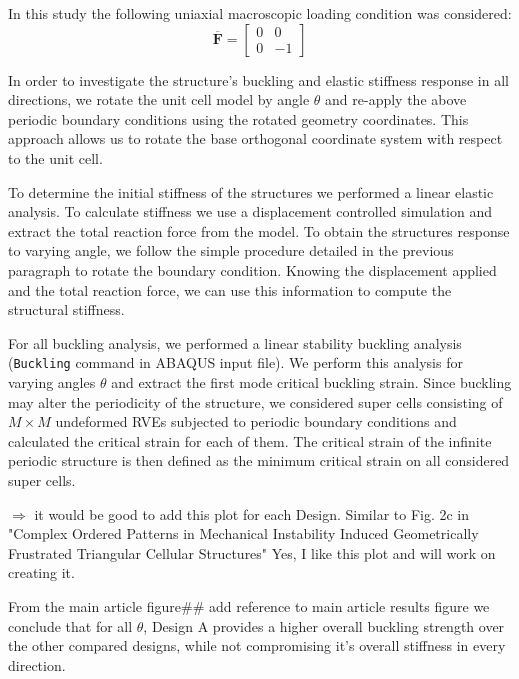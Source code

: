 \documentclass[10pt,twoside]{fernandes_supp}
\newcommand{\KB}[1]{\noindent\color{blue}$\Longrightarrow$ #1\normalcolor}
\newcommand{\mf}[1]{\colorbox{blue!10}{\color{color3}#1}}
\begin{document}
In this study the following uniaxial macroscopic loading condition was considered: \begin{equation}
\overline{\mathbf{F}} = \begin{bmatrix}
0&0\\
0&-1
\end{bmatrix} 
\end{equation}

In order to investigate the structure's buckling and elastic stiffness response in all directions, we rotate the unit cell model by angle $\theta$ and re-apply the above periodic boundary conditions using the rotated geometry coordinates. This approach allows us to rotate the base orthogonal coordinate system with respect to the unit cell. 

To determine the initial stiffness of the structures we performed a linear elastic analysis. To calculate stiffness we use a displacement controlled simulation and extract the total reaction force from the model. To obtain the structures response to varying angle, we follow the simple procedure detailed in the previous paragraph to rotate the boundary condition. Knowing the displacement applied and the total reaction force, we can use this information to compute the structural stiffness.

For all buckling analysis, we performed a linear stability buckling analysis ({\tt *Buckling} command in ABAQUS input file). We perform this analysis for varying angles $\theta$ and extract the first mode critical buckling strain. Since buckling may alter the periodicity of the
structure, we considered super cells consisting of $M \times M$
undeformed RVEs subjected to periodic boundary
conditions and calculated the critical strain for each of
them. The critical strain of the infinite periodic structure is
then defined as the minimum critical strain on all considered
super cells. 


\KB{it would be good to add this plot for each Design. Similar to Fig. 2c in "Complex Ordered Patterns in Mechanical Instability Induced Geometrically
Frustrated Triangular Cellular Structures"} \mf{Yes, I like this plot and will work on creating it.}

From the main article figure\#\# \mf{add reference to main article results figure} we conclude that for all $\theta$, Design A provides a higher overall buckling strength over the other compared designs, while not compromising it's overall stiffness in every direction.
\end{document}
